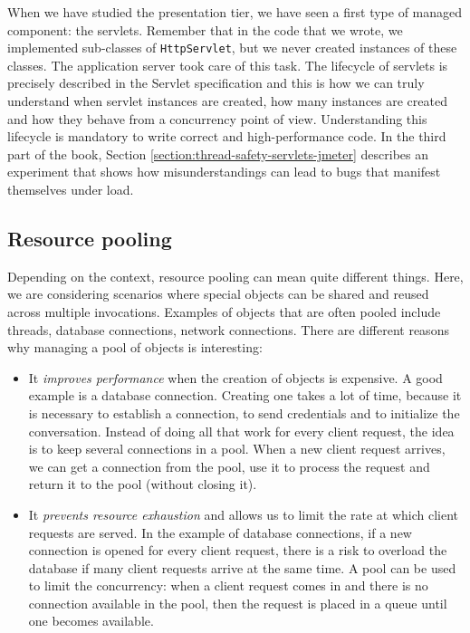 When we have studied the presentation tier, we have seen a first type of managed component: the servlets. Remember that in the code that we wrote, we implemented sub-classes of \texttt{HttpServlet}, but we never created instances of these classes. The application server took care of this task. The lifecycle of servlets is precisely described in the Servlet specification and this is how we can truly understand when servlet instances are created, how many instances are created and how they behave from a concurrency point of view. Understanding this lifecycle is mandatory to write correct and high-performance code. In the third part of the book, Section \ref{section:thread-safety-servlets-jmeter} describes an experiment that shows how misunderstandings can lead to bugs that manifest themselves under load.

\subsection{Resource pooling}


Depending on the context, resource pooling can mean quite different things. Here, we are considering scenarios where special objects can be shared and reused across multiple invocations. Examples of objects that are often pooled include threads, database connections, network connections. There are different reasons why managing a pool of objects is interesting:

\begin{itemize}
\item It \emph{improves performance} when the creation of objects is expensive. A good example is a database connection. Creating one takes a lot of time, because it is necessary to establish a connection, to send credentials and to initialize the conversation. Instead of doing all that work for every client request, the idea is to keep several connections in a pool. When a new client request arrives, we can get a connection from the pool, use it to process the request and return it to the pool (without closing it).
\item It \emph{prevents resource exhaustion} and allows us to limit the rate at which client requests are served. In the example of database connections, if a new connection is opened for every client request, there is a risk to overload the database if many client requests arrive at the same time. A pool can be used to limit the concurrency: when a client request comes in and there is no connection available in the pool, then the request is placed in a queue until one becomes available.
\end{itemize}

